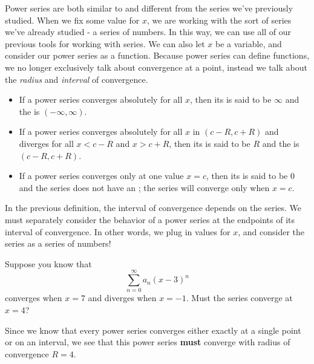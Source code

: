 \documentclass{ximera}
\begin{document}
Power series are both similar to and different from the series we've 
previously studied. When we fix some value for $x$, we are working 
with the sort of series we've already 
studied - a series of numbers.  In this way, we can use all of our previous 
tools for working with series.  We can also let $x$ be a variable, and consider 
our power series as a function.
 Because power series can define functions, we no longer exclusively
talk about convergence at a point, instead we talk about the
\textit{radius} and \textit{interval} of convergence.

\begin{definition}
  \hfil
  \begin{itemize}
    \item If a power series converges absolutely for all $x$, then its
       is said to be $\infty$ and the
       is $(-\infty,\infty)$.
    \item If a power series converges absolutely for all $x$ in
      $(c-R,c+R)$ and diverges for all $x<c-R$ and $x>c+R$, then its
       is said to be $R$ and the
       is $(c-R,c+R)$.
      \item If a power series converges only at one value $x=c$, then 
      its  is said to be $0$ and the series does not have an 
      ; the series will converge only when $x=c$.
  \end{itemize}
\end{definition}

In the previous definition, the interval of convergence depends on the series.  We must 
separately consider the behavior of a power series at the endpoints of its interval 
of convergence.  In other words, we plug in values for $x$, and consider the series 
as a series of numbers!

\begin{question}
  Suppose you know that
  \[
  \sum_{n=0}^\infty a_n (x-3)^n
  \]
  converges when $x =7$ and diverges when $x = -1$. Must the series
  converge at $x=4$?
  \begin{prompt}
    \begin{multipleChoice}
    \end{multipleChoice}
  \end{prompt}
  \begin{feedback}
    Since we know that every power series converges either exactly at
    a single point or on an interval, we see that this power series
    \textbf{must} converge with radius of convergence $R=4$.
  \end{feedback}
\end{question}
\end{document}
